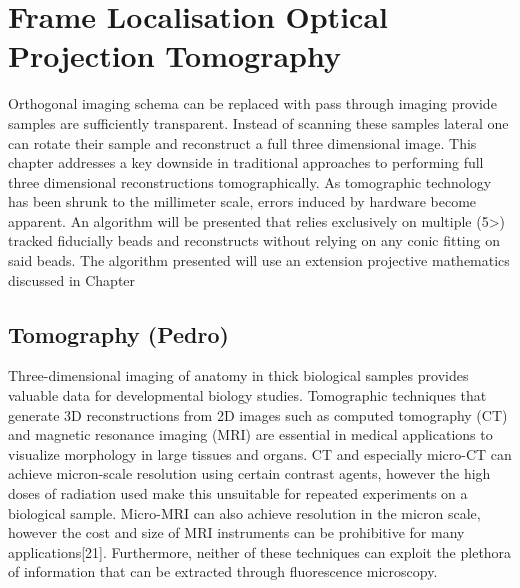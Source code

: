 \ifpdf
    \graphicspath{{Chapters/flopt/Figs/Raster/}{Chapters/flopt/Figs/PDF/}{Chapters/flopt/Figs/}}
\else
    \graphicspath{{Chapters/flopt/Figs/Vector/}{Chapters/flopt/Figs/}}
\fi

\chapter{Frame Localisation Optical Projection Tomography}

Orthogonal imaging schema can be replaced with pass through imaging provide samples are sufficiently transparent.
Instead of scanning these samples lateral one can rotate their sample and reconstruct a full three dimensional image.
This chapter addresses a key downside in traditional approaches to performing full three dimensional reconstructions tomographically.
As tomographic technology has been shrunk to the millimeter scale, errors induced by hardware become apparent.
An algorithm will be presented that relies exclusively on multiple (5>) tracked fiducially beads and reconstructs without relying on any conic fitting on said beads.
The algorithm presented will use an extension projective mathematics discussed in Chapter %


\section{Tomography (Pedro)}
Three-dimensional imaging of anatomy in thick biological samples provides valuable data for developmental biology studies.
Tomographic techniques that generate 3D reconstructions from 2D images such as computed tomography (CT) and magnetic resonance imaging (MRI) are essential in medical applications to visualize morphology in large tissues and organs.
CT and especially micro-CT can achieve micron-scale resolution using certain contrast agents, however the high doses of radiation used make this unsuitable for repeated experiments on a biological sample.
Micro-MRI can also achieve resolution in the micron scale, however the cost and size of MRI instruments can be prohibitive for many applications[21].
Furthermore, neither of these techniques can exploit the plethora of information that can be extracted through fluorescence microscopy.

